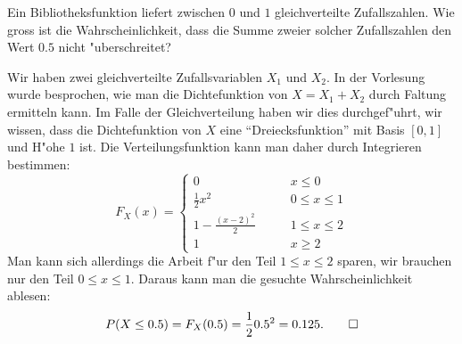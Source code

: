 Ein Bibliotheksfunktion liefert zwischen $0$ und $1$ gleichverteilte
Zufallszahlen. Wie gross ist die Wahrscheinlichkeit, dass die Summe
zweier solcher Zufallszahlen den Wert $0.5$ nicht "uberschreitet?

\begin{loesung}
Wir haben zwei gleichverteilte Zufallsvariablen $X_1$ und $X_2$. 
In der Vorlesung wurde besprochen, wie man die Dichtefunktion
von $X=X_1+X_2$ durch Faltung ermitteln kann.
Im Falle der Gleichverteilung haben wir dies durchgef"uhrt,
wir wissen, dass die Dichtefunktion von $X$
eine ``Dreiecksfunktion'' mit Basis $[0,1]$ und H"ohe $1$ ist.
Die Verteilungsfunktion kann man daher durch Integrieren bestimmen:
\[
F_X(x)=\begin{cases}
0&\qquad x\le 0\\
\frac12x^2&\qquad 0\le x\le 1\\
1-\frac{(x-2)^2}2&\qquad1\le x\le 2\\
1&\qquad x\ge 2
\end{cases}
\]
Man kann sich allerdings die Arbeit f"ur den Teil $1\le x\le 2$ sparen,
wir brauchen nur den Teil $0\le x\le 1$.
Daraus kann man die gesuchte Wahrscheinlichkeit ablesen:
\[
P(X\le 0.5)=F_X(0.5)=\frac120.5^2=0.125.
\qedhere
\]
\end{loesung}

